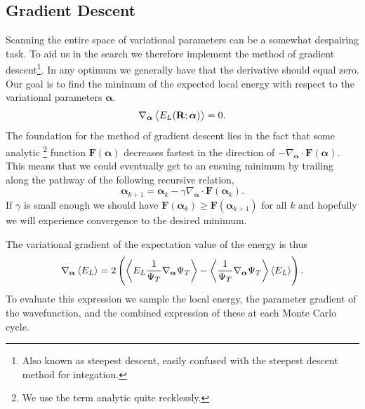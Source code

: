 \documentclass[
    a4paper, aps, twocolumn, floatfix, superscriptaddress,
    nofootinbib]{revtex4-1}
\newcommand{\vf}{\mathbf}
\newcommand{\vfg}{\boldsymbol}
\newcommand{\1}{\mathds{1}}
\begin{document}
        \subsection{Gradient Descent}
            Scanning the entire space of variational parameters can be a
            somewhat despairing task. To aid us in the search we therefore
            implement the method of gradient descent\footnote{Also known as
            steepest descent, easily confused with the steepest descent method
            for integation.}. In any optimum we generally have that the
            derivative should equal zero. Our goal is to find the minimum of the
            expected local energy with respect to the variational parameters
            $\vfg{\alpha}$.
            \begin{equation}
                \nabla_{\vfg{\alpha}} \expval{E_L(\mathbf{R}; \vfg{\alpha})}
                = 0.
            \end{equation}
            The foundation for  the method of gradient descent lies in the fact
            that some analytic \footnote{We use the term analytic quite
            recklessly.} function $\vf{F}(\vfg{\alpha})$ decreases fastest in
            the direction of $-\nabla_{\vfg{\alpha}} \cdot
            \vf{F}(\vfg{\alpha})$. This means that we could eventually get to an
            ensuing minimum by trailing along the pathway of the following
            recursive relation,
            \begin{equation}
                \vfg{\alpha}_{k+1}
                = \vfg{\alpha}_k
                - \gamma \nabla_{\vfg{\alpha}}\cdot \vf{F}(\vfg{\alpha}_k).
                \label{eq:parameter_difference}
            \end{equation}
            If $\gamma$ is small enough we should have $\vf{F}(\vfg{\alpha}_k)
            \geq \vf{F}(\vfg{\alpha}_{k+1})$ for all $k$ and hopefully we will
            experience convergence to the desired minimum.

            The variational gradient of the expectation value of the energy is
            thus
            \begin{align}
                \nabla_{\vfg{\alpha}}\expval{E_L}
                =
                2\left(
                    \expval{E_L\frac{1}{\Psi_T}\nabla_{\vfg{\alpha}}\Psi_T}
                    - \expval{\frac{1}{\Psi_T} \nabla_{\vfg{\alpha}}\Psi_T}
                    \expval{E_L}
                \right).
                \label{eq:variational_parameter_gradient}
            \end{align}
            To evaluate this expression we sample the local energy, the
            parameter gradient of the wavefunction, and the combined expression
            of these at each Monte Carlo cycle.
\end{document}
